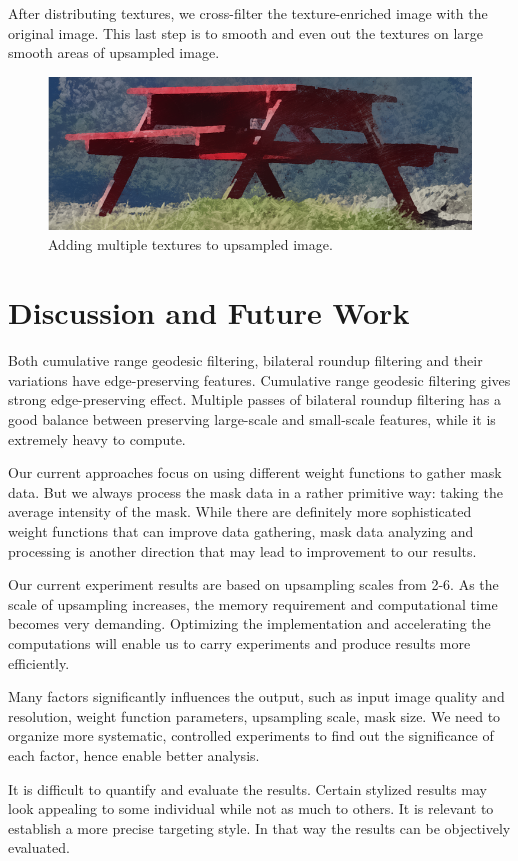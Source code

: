 After distributing textures, we cross-filter the texture-enriched image with the original image. This last step is to smooth and even out the textures on large smooth areas of upsampled image. 

\begin{figure}[htbp]
\includegraphics[width=1.0\textwidth]{f16}
\caption{Adding multiple textures to upsampled image.}
\label{fig:textureEnrichBestResult}
\end{figure}


\section{Discussion and Future Work}
Both cumulative range geodesic filtering, bilateral roundup filtering and their variations have edge-preserving features. Cumulative range geodesic filtering gives strong edge-preserving effect. Multiple passes of bilateral roundup filtering has a good balance between preserving large-scale and small-scale features, while it is extremely heavy to compute. 

Our current approaches focus on using different weight functions to gather mask data. But we always process the mask data in a rather primitive way: taking the average intensity of the mask. While there are definitely more sophisticated weight functions that can improve data gathering, mask data analyzing and processing is another direction that may lead to improvement to our results.

Our current experiment results are based on upsampling scales from 2-6. As the scale of upsampling increases, the memory requirement and computational time becomes very demanding. Optimizing the implementation and accelerating the computations will enable us to carry experiments and produce results more efficiently.

Many factors significantly influences the output, such as input image quality and resolution, weight function parameters, upsampling scale, mask size. We need to organize more systematic, controlled experiments to find out the significance of each factor, hence enable better analysis.

It is difficult to quantify and evaluate the results. Certain stylized results may look appealing to some individual while not as much to others. It is relevant to establish a more precise targeting style. In that way the results can be objectively evaluated.
